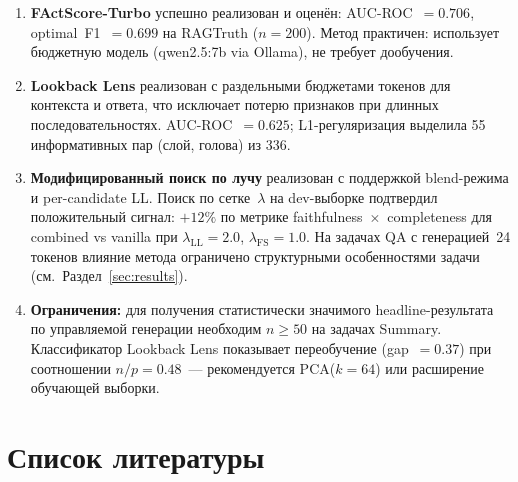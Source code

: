 \documentclass[a4paper,12pt]{extarticle}
\newcommand{\LL}{\mathrm{LL}}
\newcommand{\FS}{\mathrm{FS}}
\begin{document}
\begin{enumerate}
  \item \textbf{FActScore-Turbo} успешно реализован и оценён:
        AUC-ROC~$= 0.706$, optimal~F1~$= 0.699$ на RAGTruth ($n=200$).
        Метод практичен: использует бюджетную модель (qwen2.5:7b via Ollama),
        не требует дообучения.

  \item \textbf{Lookback Lens} реализован с раздельными бюджетами токенов для
        контекста и ответа, что исключает потерю признаков при длинных
        последовательностях.
        AUC-ROC~$= 0.625$; L1-регуляризация выделила 55 информативных пар
        (слой, голова) из 336.

  \item \textbf{Модифицированный поиск по лучу} реализован с поддержкой blend-режима
        и per-candidate LL.
        Поиск по сетке~$\lambda$ на dev-выборке подтвердил положительный сигнал:
        $+12\%$ по метрике faithfulness~$\times$~completeness для combined vs vanilla
        при $\lambda_\LL = 2.0$, $\lambda_\FS = 1.0$.
        На задачах QA с генерацией~24 токенов влияние метода ограничено
        структурными особенностями задачи (см.~Раздел~\ref{sec:results}).

  \item \textbf{Ограничения:} для получения статистически значимого
        headline-результата по управляемой генерации необходим $n \geq 50$
        на задачах Summary.
        Классификатор Lookback Lens показывает переобучение (gap~$= 0.37$)
        при соотношении $n/p = 0.48$~--- рекомендуется PCA($k=64$)
        или расширение обучающей выборки.
\end{enumerate}

\newpage
\section*{Список литературы}
\label{sec:refs}
\end{document}
